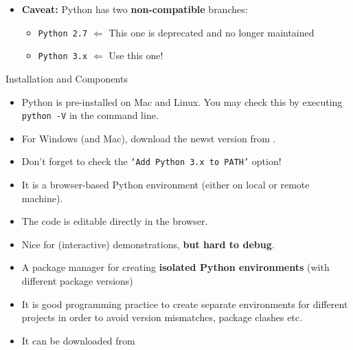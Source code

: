\begin{frame}
	\begin{itemize}
		\item \textbf{Caveat:} Python has two \textbf{non-compatible} branches:
		\begin{itemize}
			\item \texttt{Python 2.7} $\Longleftarrow$ This one is deprecated and no longer maintained
			\item \texttt{Python 3.x} $\Longleftarrow$ Use this one!
		\end{itemize}
	\end{itemize}
\end{frame}


\begin{dwHeaderFrame}{Installation and Components}
	\begin{itemize}
		\item Python is pre-installed on Mac and Linux. You may check this by executing \texttt{python -V} in the command line.
		\item For Windows (and Mac), download the newst version from .
		\item Don't forget to check the \texttt{`Add Python 3.x to PATH'} option!
	\end{itemize}
	\begin{itemize}
		\item It is a browser-based Python environment (either on local or remote machine).
		\item The code is editable directly in the browser.
		\item Nice for (interactive) demonstrations, \textbf{but hard to debug}.
	\end{itemize}
\end{dwHeaderFrame}


\begin{frame}
	\begin{itemize}
		\item A package manager for creating \textbf{isolated Python environments} (with different package versions)
		\item It is good programming practice to create separate environments for different projects in order to avoid version mismatches,
			package clashes etc.
		\item It can be downloaded from 
	\end{itemize}
	
\end{frame}


